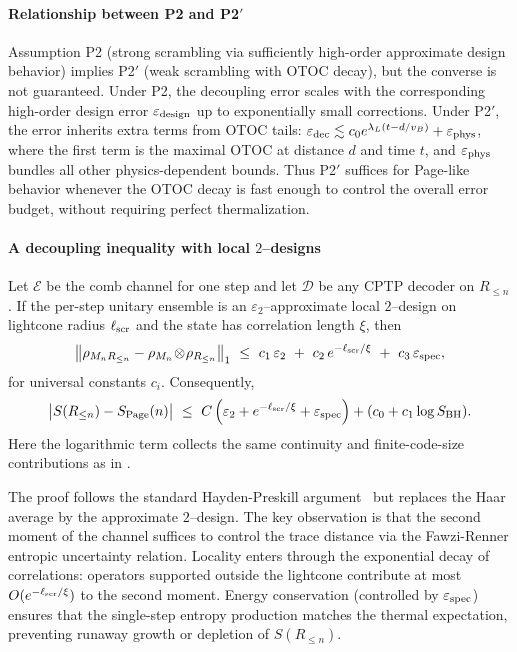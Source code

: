 \documentclass[a4paper,11pt]{article}
\theoremstyle{plain}
\theoremstyle{definition}
\theoremstyle{remark}
\begin{document}
\paragraph{Relationship between P2 and \texorpdfstring{P2$'$}{P2'}}
Assumption P2 (strong scrambling via sufficiently high-order approximate design behavior) implies P2$'$ (weak scrambling with OTOC decay), but the converse is not guaranteed. Under P2, the decoupling error scales with the corresponding high-order design error $\varepsilon_{\rm design}$ up to exponentially small corrections. Under P2$'$, the error inherits extra terms from OTOC tails: $\varepsilon_{\rm dec} \lesssim c_0 e^{\lambda_L(t - d/v_B)} + \varepsilon_{\rm phys}$, where the first term is the maximal OTOC at distance $d$ and time $t$, and $\varepsilon_{\rm phys}$ bundles all other physics-dependent bounds. Thus P2$'$ suffices for Page-like behavior whenever the OTOC decay is fast enough to control the overall error budget, without requiring perfect thermalization.

\paragraph{A decoupling inequality with local \texorpdfstring{$2$}{2}--designs}
Let $\mathcal{E}$ be the comb channel for one step and let $\mathcal{D}$ be any CPTP decoder on $R_{\le n}$. If the per-step unitary ensemble is an $\varepsilon_2$--approximate local $2$--design on lightcone radius $\ell_{\rm scr}$ and the state has correlation length $\xi$, then
\begin{equation}
\left\| \rho_{M_n R_{\le n}} - \rho_{M_n}\!\otimes\!\rho_{R_{\le n}} \right\|_1 \ \le\ c_1\,\varepsilon_2\ +\ c_2\,e^{-\ell_{\rm scr}/\xi}\ +\ c_3\,\varepsilon_{\rm spec},
\end{equation}
for universal constants $c_i$. Consequently,
\begin{equation}
\big| S(R_{\le n}) - S_{\rm Page}(n) \big| \ \le\ C\left(\varepsilon_2 + e^{-\ell_{\rm scr}/\xi} + \varepsilon_{\rm spec}\right) + (c_0+c_1\log S_{\rm BH}).
\end{equation}
Here the logarithmic term collects the same continuity and finite-code-size contributions as in .

The proof follows the standard Hayden-Preskill argument~\cite{Hayden:2007} but replaces the Haar average by the approximate $2$--design. The key observation is that the second moment of the channel suffices to control the trace distance via the Fawzi-Renner entropic uncertainty relation. Locality enters through the exponential decay of correlations: operators supported outside the lightcone contribute at most $O(e^{-\ell_{\rm scr}/\xi})$ to the second moment. Energy conservation (controlled by $\varepsilon_{\rm spec}$) ensures that the single-step entropy production matches the thermal expectation, preventing runaway growth or depletion of $S(R_{\le n})$.
\end{document}
